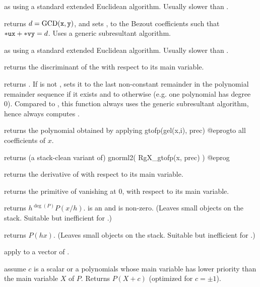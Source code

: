  as  using a standard
extended Euclidean algorithm. Usually slower than .

 returns
$d = {\rm GCD}({\tt x},{\tt y})$, and sets ,  to the Bezout
coefficients such that ${\tt *ux} + {\tt *vy} = d$. Uses a generic
subresultant algorithm.

 as
 using a standard extended Euclidean algorithm. Usually
slower than .

 returns the discriminant of the  
with respect to its main variable.

 returns
. If  is not , sets it to the last
non-constant remainder in the polynomial remainder sequence if it exists and to
 otherwise (e.g. one polynomial has degree 0). Compared to
, this function always uses the generic subresultant
algorithm, hence always computes .


 returns the polynomial obtained by
applying
\bprog
  gtofp(gel(x,i), prec)
@eprog\noindent to all coefficients of $x$.

 returns (a stack-clean variant of)
\bprog
  gnorml2( RgX_gtofp(x, prec) )
@eprog

 returns the derivative of  with respect to
its main variable.

 returns the primitive of  vanishing at
$0$, with respect to its main variable.

 returns $h^{\deg(P)} P(x/h)$.
 is an  and  is non-zero. (Leaves small objects on the
stack. Suitable but inefficient for .)

 returns $P(h x)$. (Leaves small objects
on the stack. Suitable but inefficient for .)

 apply  to a vector
of .

 assume $c$ is a scalar or
a polynomials whose main variable has lower priority than the main variable
$X$ of $P$. Returns $P(X + c)$ (optimized for $c = \pm 1$).

